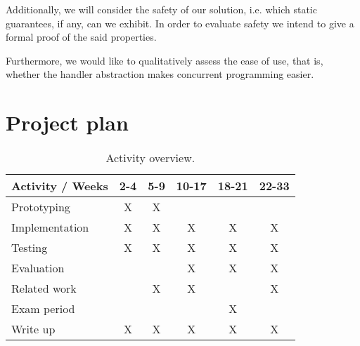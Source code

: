 \documentclass[preprint,10pt,numbers]{sigplanconf}
\begin{document}
Additionally, we will consider the safety of our solution, i.e. which static guarantees, if any, can we exhibit. In order to evaluate safety we intend to give a formal proof of the said properties.

Furthermore, we would like to qualitatively assess the ease of use, that is, whether the handler abstraction makes concurrent programming easier.

  \section{Project plan}
  \begin{table}[H]
    \centering
    \begin{tabular}{ | l | c | c | c | c | c | }
      \hline
      \multicolumn{1}{|c|}{Activity / Weeks} & 2-4 & 5-9 & 10-17 & 18-21 & 22-33 \\
      \hline
      Prototyping    & X & X & & & \\
      \hline
      Implementation & X & X & X & X & X \\
      \hline
      Testing        & X & X & X & X & X \\
      \hline
      Evaluation     &   &   & X & X & X \\
      \hline
      Related work   &   & X & X &   & X \\
      \hline
      Exam period    &   &   &   & X &   \\
      \hline
      Write up       & X & X & X & X & X  \\
      \hline
    \end{tabular}\caption{Activity overview.}
  \end{table}

\softraggedright

\end{document}
